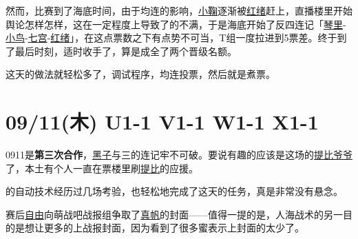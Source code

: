 然而，比赛到了海底时间，由于均连的影响，\uline{小鞠}逐渐被\uline{红绪}赶上，直播楼里开始舆论怎样怎样，这在一定程度上导致了的不满，于是海底开始了反四连记「\uline{琴里}-\uline{小鸟}-\uline{七宫}-\uline{红绪}」，在这点票数之下有点势不可当，T组一度拉进到5票差。终于到了最后时刻，适时收手了，算是成全了两个晋级名额。

这天的做法就轻松多了，调试程序，均连投票，然后就是煮票。

\section{09/11(木) U1-1 V1-1 W1-1 X1-1}


0911是\textbf{第三次合作}，\uline{黑子}与三的连记牢不可破。要说有趣的应该是这场的\uline{提比爷爷}了，本土有个人一直在票楼里刷\uline{提比}的应援。

的自动技术经历过几场考验，也轻松地完成了这天的任务，真是非常没有悬念。

赛后\uline{自由}向{萌战吧}战报组争取了\uline{真帆}的封面——值得一提的是，人海战术的另一目的是想让更多的上战报封面，因为看到了很多蜜表示上封面的太少了。

